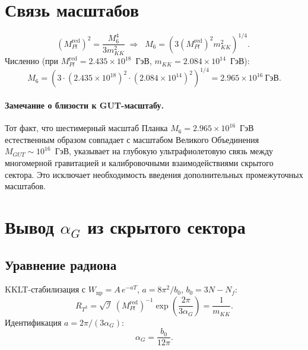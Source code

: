 \documentclass[12pt,a4paper]{article}
\numberwithin{equation}{section}
\begin{document}
\section{Связь масштабов}
\begin{equation}
(M_{Pl}^{\text{red}})^2 = \frac{M_6^4}{3m_{KK}^2} 
\;\Longrightarrow\; 
\boxed{\;M_6 = \left(3(M_{Pl}^{\text{red}})^2 m_{KK}^2\right)^{1/4}.\;}
\end{equation}
Численно (при $M_{Pl}^{\text{red}} = 2.435\times 10^{18}$~ГэВ, 
$m_{KK} = 2.084\times 10^{14}$~ГэВ):
\begin{equation}
M_6 = \left(3\cdot (2.435\times 10^{18})^2\cdot 
(2.084\times 10^{14})^2\right)^{1/4} = 2.965\times 10^{16}~\text{ГэВ}.
\end{equation}

\paragraph{Замечание о близости к GUT-масштабу.}
Тот факт, что шестимерный масштаб Планка $M_6 = 2.965\times 10^{16}$~ГэВ 
естественным образом совпадает с масштабом Великого Объединения 
$M_{GUT} \sim 10^{16}$~ГэВ, указывает на глубокую ультрафиолетовую связь 
между многомерной гравитацией и калибровочными взаимодействиями скрытого 
сектора. Это исключает необходимость введения дополнительных промежуточных 
масштабов.

\section{Вывод $\alpha_G$ из скрытого сектора}

\subsection{Уравнение радиона}
KKLT-стабилизация с $W_{\text{np}} = A\,e^{-aT}$, $a = 8\pi^2/b_0$, 
$b_0 = 3N - N_f$:
\begin{equation}
R_{T^2} = \sqrt{\mathcal{I}}\,(M_{Pl}^{\text{red}})^{-1}
\exp\!\left(\frac{2\pi}{3\alpha_G}\right) = \frac{1}{m_{KK}}.
\end{equation}
Идентификация $a = 2\pi/(3\alpha_G)$:
\begin{equation}
\boxed{\;\alpha_G = \frac{b_0}{12\pi}.\;}
\end{equation}
\end{document}

